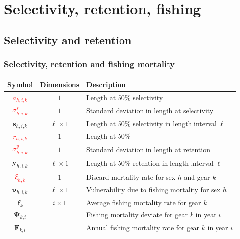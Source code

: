 \documentclass{beamer}
\begin{document}
\section{Selectivity, retention, fishing}


\subsection{Selectivity and retention}
\begin{frame}
\frametitle{Selectivity, retention and fishing mortality}
\begin{table}
  \centering
  \begin{tabular}{ccl}
  \hline
  Symbol & Dimensions & Description \\
  \hline
      \textcolor{red}{$a_{h,i,k}$} & $1$ & Length at 50\% selectivity \\
      \textcolor{red}{$\sigma^s_{h,i,k}$} & $1$ & Standard deviation in length at selectivity \\
      $\boldsymbol{s}_{h,i,k}$ & $\ell \times 1$ & Length at 50\% selectivity in length interval $\ell$ \\
      \textcolor{red}{$r_{h,i,k}$} & $1$ & Length at 50\% \\
      \textcolor{red}{$\sigma^y_{h,i,k}$} & $1$ & Standard deviation in length at retention \\
      $\boldsymbol{y}_{h,i,k}$ & $\ell \times 1$ & Length at 50\% retention in length interval $\ell$ \\
      \textcolor{red}{$\xi_{h,k}$} & $1$ & Discard mortality rate for sex $h$ and gear $k$ \\
      $\boldsymbol\nu_{h,i,k}$ & $\ell \times 1$ & Vulnerability due to fishing mortality for sex $h$ \\
      $\bar{\boldsymbol{f}}_k$ & $i \times 1$ & Average fishing mortality rate for gear $k$ \\
      $\boldsymbol\Psi_{k,i}$ & & Fishing mortality deviate for gear $k$ in year $i$ \\
      $\boldsymbol{F}_{k,i}$ & & Annual fishing mortality rate for gear $k$ in year $i$ \\
  \hline
  \end{tabular}
\end{table}
\end{frame}
\end{document}
